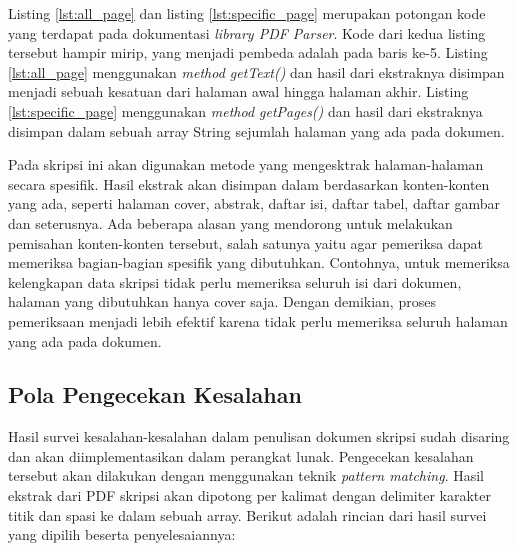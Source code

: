 Listing \ref{lst:all_page} dan listing \ref{lst:specific_page} merupakan potongan kode yang terdapat pada dokumentasi \textit{library PDF Parser}. Kode dari kedua listing tersebut hampir mirip, yang menjadi pembeda adalah pada baris ke-5. Listing \ref{lst:all_page} menggunakan \textit{method getText()} dan hasil dari ekstraknya disimpan menjadi sebuah kesatuan dari halaman awal hingga halaman akhir. Listing \ref{lst:specific_page} menggunakan \textit{method getPages()} dan hasil dari ekstraknya disimpan dalam sebuah array String sejumlah halaman yang ada pada dokumen.

Pada skripsi ini akan digunakan metode yang mengesktrak halaman-halaman secara spesifik. Hasil ekstrak akan disimpan dalam berdasarkan konten-konten yang ada, seperti halaman cover, abstrak, daftar isi, daftar tabel, daftar gambar dan seterusnya. Ada beberapa alasan yang mendorong untuk melakukan pemisahan konten-konten tersebut, salah satunya yaitu agar pemeriksa dapat memeriksa bagian-bagian spesifik yang dibutuhkan. Contohnya, untuk memeriksa kelengkapan data skripsi tidak perlu memeriksa seluruh isi dari dokumen, halaman yang dibutuhkan hanya cover saja. Dengan demikian, proses pemeriksaan menjadi lebih efektif karena tidak perlu memeriksa seluruh halaman yang ada pada dokumen.

\subsection{Pola Pengecekan Kesalahan}
Hasil survei kesalahan-kesalahan dalam penulisan dokumen skripsi sudah disaring dan akan diimplementasikan dalam perangkat lunak. Pengecekan kesalahan tersebut akan dilakukan dengan menggunakan teknik \textit{pattern matching}. Hasil ekstrak dari PDF skripsi akan dipotong per kalimat dengan delimiter karakter titik dan spasi ke dalam sebuah array. Berikut adalah rincian dari hasil survei yang dipilih beserta penyelesaiannya:

